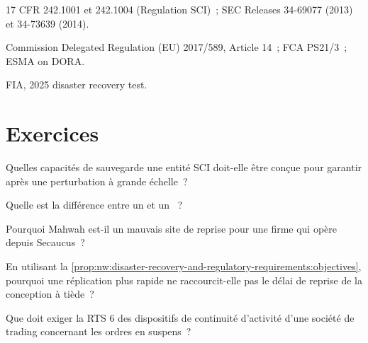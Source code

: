 \begin{omsources}
\item 17 CFR 242.1001 et 242.1004 (Regulation SCI)~; SEC Releases 34-69077 (2013) et 34-73639 (2014).
\item Commission Delegated Regulation (EU) 2017/589, Article 14~; FCA PS21/3~; ESMA on DORA.
\item FIA, 2025 disaster recovery test.
\end{omsources}

\section{Exercices}

\begin{exercise}[$\star$]\label{exo:nw:disaster-recovery-and-regulatory-requirements:1}
Quelles capacités de sauvegarde une entité SCI doit-elle être conçue pour garantir après une perturbation à grande échelle~?
\end{exercise}

\begin{exercise}[$\star$]\label{exo:nw:disaster-recovery-and-regulatory-requirements:2}
Quelle est la différence entre un  et un ~?
\end{exercise}

\begin{exercise}[$\star$]\label{exo:nw:disaster-recovery-and-regulatory-requirements:3}
Pourquoi Mahwah est-il un mauvais site de reprise pour une firme qui opère depuis Secaucus~?
\end{exercise}

\begin{exercise}[$\star\star$]\label{exo:nw:disaster-recovery-and-regulatory-requirements:4}
En utilisant la \cref{prop:nw:disaster-recovery-and-regulatory-requirements:objectives}, pourquoi une réplication plus rapide ne raccourcit-elle pas le
délai de reprise de la conception à tiède~?
\end{exercise}

\begin{exercise}[$\star\star$]\label{exo:nw:disaster-recovery-and-regulatory-requirements:5}
Que doit exiger la RTS 6 des dispositifs de continuité d'activité d'une société de trading concernant les ordres en suspens~?
\end{exercise}

